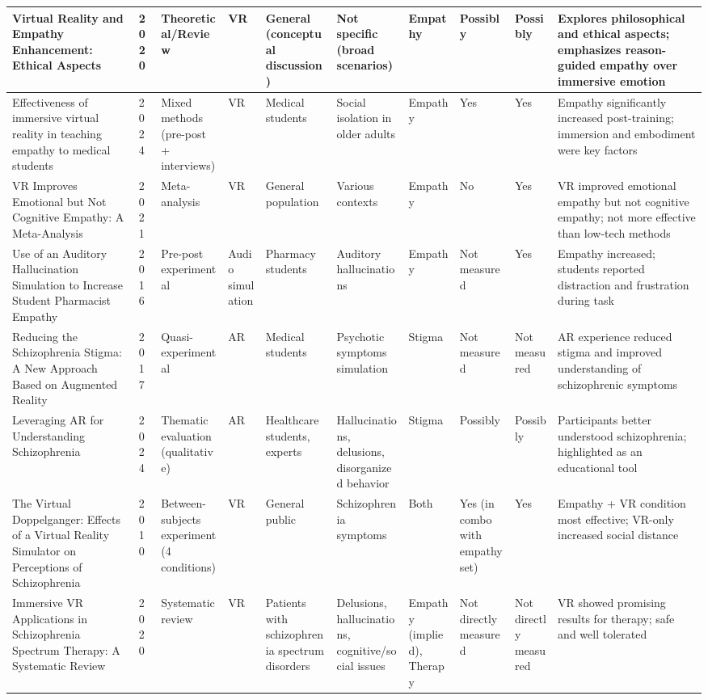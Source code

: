 \begin{landscape}
\begin{longtable}{|p{2.8cm}|p{0.6cm}|p{1.8cm}|p{1.2cm}|p{1.2cm}|p{2cm}|p{1.2cm}|p{1.2cm}|p{1.2cm}|p{3cm}|}
    \hline
    Virtual Reality and Empathy Enhancement: Ethical Aspects & 2020 & Theoretical/Review & VR & General (conceptual discussion) & Not specific (broad scenarios) & Empathy & Possibly & Possibly & Explores philosophical and ethical aspects; emphasizes reason-guided empathy over immersive emotion \\
    \hline
    Effectiveness of immersive virtual reality in teaching empathy to medical students & 2024 & Mixed methods (pre-post + interviews) & VR & Medical students & Social isolation in older adults & Empathy & Yes & Yes & Empathy significantly increased post-training; immersion and embodiment were key factors \\
    \hline
    VR Improves Emotional but Not Cognitive Empathy: A Meta-Analysis & 2021 & Meta-analysis & VR & General population & Various contexts & Empathy & No & Yes & VR improved emotional empathy but not cognitive empathy; not more effective than low-tech methods \\
    \hline
    Use of an Auditory Hallucination Simulation to Increase Student Pharmacist Empathy & 2016 & Pre-post experimental & Audio simulation & Pharmacy students & Auditory hallucinations & Empathy & Not measured & Yes & Empathy increased; students reported distraction and frustration during task \\
    \hline
    Reducing the Schizophrenia Stigma: A New Approach Based on Augmented Reality & 2017 & Quasi-experimental & AR & Medical students & Psychotic symptoms simulation & Stigma & Not measured & Not measured & AR experience reduced stigma and improved understanding of schizophrenic symptoms \\
    \hline
    Leveraging AR for Understanding Schizophrenia & 2024 & Thematic evaluation (qualitative) & AR & Healthcare students, experts & Hallucinations, delusions, disorganized behavior & Stigma & Possibly & Possibly & Participants better understood schizophrenia; highlighted as an educational tool \\
    \hline
    The Virtual Doppelganger: Effects of a Virtual Reality Simulator on Perceptions of Schizophrenia & 2010 & Between-subjects experiment (4 conditions) & VR & General public & Schizophrenia symptoms & Both & Yes (in combo with empathy set) & Yes & Empathy + VR condition most effective; VR-only increased social distance \\
    \hline
    Immersive VR Applications in Schizophrenia Spectrum Therapy: A Systematic Review & 2020 & Systematic review & VR & Patients with schizophrenia spectrum disorders & Delusions, hallucinations, cognitive/social issues & Empathy (implied), Therapy & Not directly measured & Not directly measured & VR showed promising results for therapy; safe and well tolerated \\

\end{longtable}
\end{landscape}
